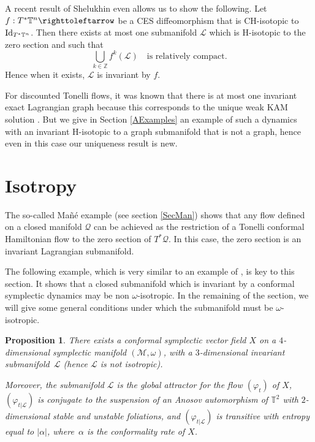 \documentclass[10pt]{amsart}
\newtheorem{proposition}{Proposition}
\theoremstyle{definition}
\def\Z{\mathbb{Z}}
\def\T{\mathbb{T}}
\def\cL{{\mathcal L}}
\def\cM{{\mathcal M}}
\def\cQ{{\mathcal Q}}
\begin{document}
A recent result of Shelukhin even allows us to show the following. Let $f:T^*\T^n \righttoleftarrow$ be a CES diffeomorphism that is CH-isotopic to ${\rm Id}_{T^*\T^n}$. Then there exists at most one submanifold $\cL$ which is H-isotopic to the zero section and such that
\[
\bigcup_{k\in\Z}f^k(\cL)\quad\text{is relatively compact}.
\]
Hence when it exists, $\cL$ is invariant by $f$.

For discounted Tonelli flows, it was known that there is at most one invariant exact Lagrangian graph because this corresponds to the unique weak KAM solution \cite{MarSor2017}. But we give in Section \ref{AExamples} an example of such a dynamics with an invariant H-isotopic to a graph submanifold that is not a graph, hence even in this case our uniqueness result is new.

\section{Isotropy}\label{Sisotropy}

The so-called Mañé example \cite{Man1992} (see section \ref{SecMan}) shows that any flow defined on a closed manifold $\cQ$ can be achieved as the restriction of a Tonelli conformal
Hamiltonian flow to the zero section of $T^*\cQ$. In this case, the zero section is an invariant Lagrangian submanifold.

The following example, which is very similar to an example of \cite{Geiges1995}, is key to this section. It shows that a closed submanifold which is invariant by a conformal symplectic dynamics may be non $\omega$-isotropic. In the remaining of the section, we will give some general conditions under which the submanifold must be $\omega$-isotropic.

\begin{proposition}\label{Pflownonisotrop}
There exists a conformal symplectic vector field $X$ on a $4$\nobreakdash-dimen\-sional symplectic manifold $({\cM}, \omega)$, with a $3$\nobreakdash-dimensional invariant submani\-fold~${\cL}$ (hence ${\cL}$ is not isotropic).

Moreover, the submanifold ${\cL}$ is the global attractor for the flow $(\varphi_t)$ of $X$, $(\varphi_{t|\cL})$ is conjugate to the suspension of an Anosov automorphism of $\T^2$ with $2$\nobreakdash-dimensional stable and unstable foliations, and $(\varphi_{t|\cL})$ is transitive with entropy equal to $|\alpha|$, where~$\alpha$ is the conformality rate of $X$.
\end{proposition}
\end{document}
